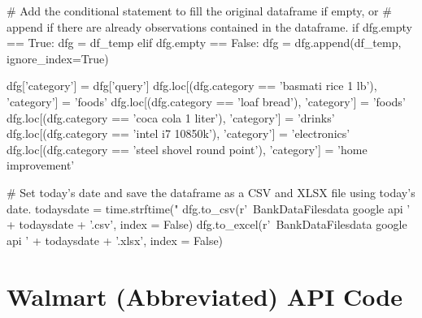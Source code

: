 \begin{python}
        # Add the conditional statement to fill the original dataframe if empty, or 
        # append if there are already observations contained in the dataframe.
        if dfg.empty == True:
            dfg = df_temp
        elif dfg.empty == False:
            dfg = dfg.append(df_temp, ignore_index=True)
            
dfg['category'] = dfg['query']
dfg.loc[(dfg.category == 'basmati rice 1 lb'), 'category'] = 'foods'
dfg.loc[(dfg.category == 'loaf bread'), 'category'] = 'foods'
dfg.loc[(dfg.category == 'coca cola 1 liter'), 'category'] = 'drinks'
dfg.loc[(dfg.category == 'intel i7 10850k'), 'category'] = 'electronics'
dfg.loc[(dfg.category == 'steel shovel round point'), 'category'] = 'home improvement'

# Set today's date and save the dataframe as a CSV and XLSX file using today's date.
todaysdate = time.strftime("%
dfg.to_csv(r'~\World Bank\Data\Google Data\CSV Files\PPP data google api ' + 
           todaysdate + '.csv', index = False)
dfg.to_excel(r'~\tluen\World Bank\Data\Google Data\Excel Files\PPP data google api ' 
            + todaysdate + '.xlsx', index = False)
\end{python}

\section{Walmart (Abbreviated) API Code}
\label{appendixB}

